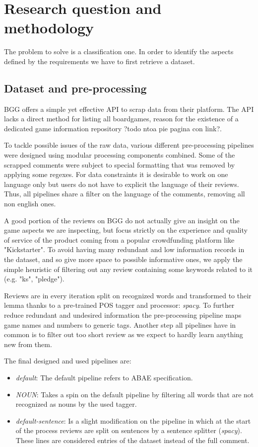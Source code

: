\section{Research question and methodology}
The problem to solve is a classification one.
In order to identify the aspects defined by the requirements we have to first retrieve a dataset.

\subsection{Dataset and pre-processing}
BGG offers a simple yet effective API to scrap data from their platform.
The API lacks a direct method for listing all boardgames, reason for the existence of a dedicated game information
repository ?todo ntoa pie pagina con link?.

To tackle possible issues of the raw data, various different pre-processing pipelines were designed
using modular processing components combined.
Some of the scrapped comments were subject to special formatting that was removed by applying some regexes.
For data constraints it is desirable to work on one language only but users do not have to explicit the language of their reviews.
Thus, all pipelines share a filter on the language of the comments, removing all non english ones.

A good portion of the reviews on BGG do not actually give an insight on the game aspects we are inspecting,
but focus strictly on the experience and quality of service of the product coming from a popular crowdfunding platform like "Kickstarter".
To avoid having many redundant and low information records in the dataset, and so give more space to possible informative ones,
we apply the simple heuristic of filtering out any review containing some keywords related to it (e.g. "ks", "pledge").

Reviews are in every iteration split on recognized words and transformed to their lemma thanks to a pre-trained
POS tagger and processor: \textit{spacy}.
To further reduce redundant and undesired information the pre-processing pipeline maps game names and numbers to generic tags.
Another step all pipelines have in common is to filter out too short review as we expect to hardly learn anything new from them.

The final designed and used pipelines are:
\begin{itemize}
    \item {\textit{default}}: The default pipeline refers to ABAE specification.

    \item {\textit{NOUN}}: Takes a spin on the default pipeline by filtering all words that are not recognized as nouns
    by the used tagger. %

    \item {\textit{default-sentence}}: Is a slight modification on the  pipeline in which
    at the start of the process reviews are split on sentences by a sentence splitter (\textit{spacy}).
    These lines are considered entries of the dataset instead of the full comment.
\end{itemize}

